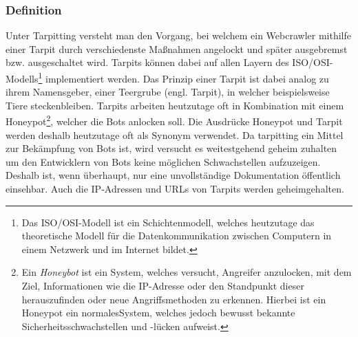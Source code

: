 \subsubsection{Definition}
Unter Tarpitting versteht man den Vorgang, bei welchem ein Webcrawler mithilfe einer Tarpit durch verschiedenste Maßnahmen angelockt und später ausgebremst bzw. ausgeschaltet wird. Tarpits können dabei auf allen Layern des ISO/OSI-Modells\footnote{Das ISO/OSI-Modell ist ein Schichtenmodell, welches heutzutage das theoretische Modell für die Datenkommunikation zwischen Computern in einem Netzwerk und im Internet bildet.\cite[430]{gallenbacher-iso-osi}} implementiert werden.\cite{tarpit-wikipedia} Das Prinzip einer Tarpit ist dabei analog zu ihrem Namensgeber, einer Teergrube (engl. Tarpit), in welcher beispielsweise Tiere steckenbleiben. Tarpits arbeiten heutzutage oft in Kombination mit einem Honeypot\footnote{Ein \emph{Honeybot} ist ein System, welches versucht, Angreifer anzulocken, mit dem Ziel, Informationen wie die IP-Adresse oder den Standpunkt dieser herauszufinden oder neue Angriffsmethoden zu erkennen. Hierbei ist ein Honeypot ein \glqq normales\grqq\space System, welches jedoch bewusst bekannte Sicherheitsschwachstellen und -lücken aufweist.\cite{def-honeybot}}, welcher die Bots anlocken soll. Die Ausdrücke Honeypot und Tarpit werden deshalb heutzutage oft als Synonym verwendet.\cite{honeypot-tarpit-synonym}
Da tarpitting ein Mittel zur Bekämpfung von Bots ist, wird versucht es weitestgehend geheim zuhalten um den Entwicklern von Bots keine möglichen Schwachstellen aufzuzeigen. Deshalb ist, wenn überhaupt, nur eine unvollständige Dokumentation öffentlich einsehbar. Auch die IP-Adressen und URLs von Tarpits werden geheimgehalten.
\label{subsub:tarpitting}